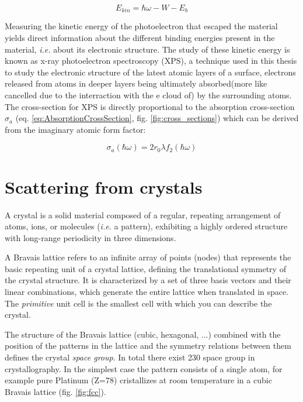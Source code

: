 \begin{equation}
    E_{kin} = \hbar\omega - W - E_b
\end{equation}

Measuring the kinetic energy of the photoelectron that escaped the material yields direct information about the different binding energies present in the material, \textit{i.e.} about its electronic structure.
The study of these kinetic energy is known as x-ray photoelectron spectroscopy (XPS),
a technique used in this thesis to study the electronic structure of the latest atomic layers of a surface, electrons released from atoms in deeper layers being ultimately absorbed(more like cancelled due to the interraction with the e cloud of) by the surrounding atoms.
The cross-section for XPS is directly proportional to the absorption cross-section $\sigma_a$ (eq. \ref{eq:AbsorptionCrossSection}, fig. \ref{fig:cross_sections}) which can be derived from the imaginary atomic form factor:

\begin{equation}
    \label{eq:AbsorptionCrossSection}
    \sigma_a(\hbar\omega) = 2 r_0 \lambda f_2(\hbar\omega)
\end{equation}

\section{Scattering from crystals}

A crystal is a solid material composed of a regular, repeating arrangement of atoms, ions, or molecules (\textit{i.e.} a pattern), exhibiting a highly ordered structure with long-range periodicity in three dimensions.

A Bravais lattice refers to an infinite array of points (nodes) that represents the basic repeating unit of a crystal lattice, defining the translational symmetry of the crystal structure.
It is characterized by a set of three basis vectors and their linear combinations, which generate the entire lattice when translated in space.
The \textit{primitive} unit cell is the smallest cell with which you can describe the crystal.

The structure of the Bravais lattice (cubic, hexagonal, ...) combined with the position of the patterns in the lattice and the symmetry relations between them defines the crystal \textit{space group}.
In total there exist 230 space group in crystallography.
In the simplest case the pattern consists of a single atom, for example pure Platinum (Z=78) cristallizes at room temperature in a cubic Bravais lattice (fig. \ref{fig:fcc}).

